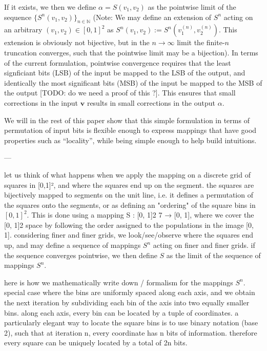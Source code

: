 \documentclass[NETN,manuscript]{stjour-new}
\renewcommand{\vec}[1]{\boldsymbol{#1}}
\begin{document}
If it exists, we then we define $\alpha = S(v_1, v_2)$ as the pointwise limit of the sequence $\{S^n(v_1, v_2)\}_{n \in \mathbb N}$ (Note: We may define an extension of $S^n$ acting on an arbitrary $(v_1, v_2) \in [0,1]^2$ as $S^n(v_1, v_2) := S^n(v_1^{(n)}, v_2^{(n)})$. This extension is obviously not bijective, but in the $n \to \infty$ limit the finite-$n$ truncation converges, such that the pointwise limit may be a bijection). In terms of the current formulation, pointwise convergence requires that the least signficiant bits (LSB) of the input be mapped to the LSB of the output, and identically the most significant bits (MSB) of the input be mapped to the MSB of the output [TODO: do we need a proof of this ?]. This ensures that small corrections in the input $\vec{v}$ results in small corrections in the output $\alpha$.

We will in the rest of this paper show that this simple formulation in terms of permutation of input bits is flexible enough to express mappings that have good properties such as ``locality'', while being simple enough to help build intuitions.



---

let us think of what happens when we apply the mapping on a discrete grid of squares in [0,1]², and where the squares end up on the segment.
the squares are bijectively mapped to segments on the unit line, i.e. it defines a permutation of the squares onto the segments, or as defining an "ordering" of the square bins in $[0,1]^2$. This is done using a mapping S : [0, 1]2 7 → [0, 1],
where we cover the [0, 1]2 space by following the order assigned to the populations in
the image [0, 1].
considering finer and finer grids, we look/see/observe where the squares end up, and may define a sequence of mappings $S^n$ acting on finer and finer grids.
if the sequence converges pointwise, we then define $S$ as the limit of the sequence of mappings $S^n$.


here is how we mathematically write down / formalism for the mappings $S^n$.
special case where the bins are uniformly spaced along each axis, and we obtain the next iteration by subdividing each bin of the axis into two equally smaller bins.
along each axis, every bin can be located by a tuple of coordinates. a particularly elegant way to locate the square bins is to use binary notation (base 2), such that at iteration n, every coordinate has n bits of information. therefore every square can be uniquely located by a total of 2n bits.
\end{document}
